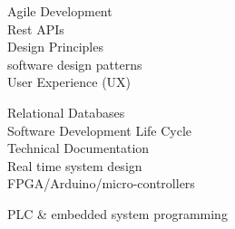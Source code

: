 \documentclass[letterpaper]{deedy-resume}
\begin{document}
\begin{center}
\begin{minipage}[t]{0.29\textwidth}

\textbullet   Agile Development \\ \vspace{1mm}
\textbullet  Rest APIs  \\ \vspace{1mm}
\textbullet Design Principles \\ \vspace{1mm}
\textbullet software design patterns \\ \vspace{1mm}
\textbullet User Experience (UX) \\ \vspace{1mm}

\textbullet   Relational Databases \\ \vspace{1mm}
\textbullet   Software Development Life Cycle \\ \vspace{1mm}
\textbullet  Technical Documentation \\ \vspace{1mm}
\textbullet  Real time system design \\\vspace{1mm}
\textbullet  FPGA/Arduino/micro-controllers \\ \vspace{1mm}

\textbullet  PLC \& embedded system programming \\ \vspace{1mm}


\end{minipage}
\end{center}
\end{document}
